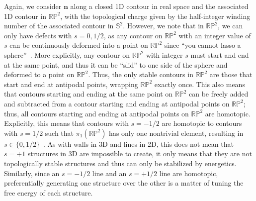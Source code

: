 Again, we consider $\mathbf{n}$ along a closed 1D contour in real space and the associated 1D contour in $\mathbb{R}\mathbb{P}^2$, with the topological charge given by the half-integer winding number of the associated contour in $\mathbb{S}^2$.
However, we note that in $\mathbb{R}\mathbb{P}^2$, we can only have defects with $s =0,1/2$, as any contour on $\mathbb{R}\mathbb{P}^2$ with an integer value of $s$ can be continuously deformed into a point on $\mathbb{R}\mathbb{P}^2$ since ``you cannot lasso a sphere''~\cite{RN153}.
More explicitly, any contour on  $\mathbb{R}\mathbb{P}^2$ with integer $s$ must start and end at the same point, and thus it can be ``slid'' to one side of the sphere and deformed to a point on $\mathbb{R}\mathbb{P}^2$.
Thus, the only stable contours in $\mathbb{R}\mathbb{P}^2$ are those that start and end at antipodal points, wrapping $\mathbb{R}\mathbb{P}^2$ exactly once.
This also means that contours starting and ending at the same point on $\mathbb{R}\mathbb{P}^2$ can be freely added and subtracted from a contour starting and ending at antipodal points on $\mathbb{R}\mathbb{P}^2$; thus, all contours starting and ending at antipodal points on $\mathbb{R}\mathbb{P}^2$ are homotopic.
Explicitly, this means that contours with $s = -1/2$ are homotopic to contours with $s = 1/2$ such that $\pi_1(\mathbb{R}\mathbb{P}^2)$ has only one nontrivial element, resulting in $s \in \{ 0,1/2\}$~\cite{RN153}.
As with walls in 3D and lines in 2D, this does not mean that $s = +1$ structures in 3D are impossible to create, it only means that they are not topologically stable structures and thus can only be stabilized by energetics.
Similarly, since an $s = -1/2$ line and an $s = +1/2$ line are homotopic, preferentially generating one structure over the other is a matter of tuning the free energy of each structure.\\

